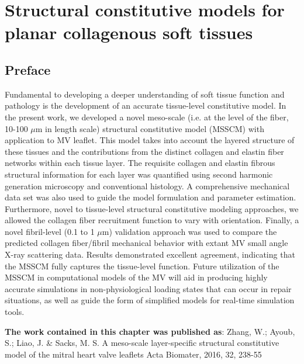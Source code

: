 \chapter{Structural constitutive models for planar collagenous soft tissues}


\section*{Preface}
%

    Fundamental to developing a deeper understanding of soft tissue function and pathology is the development of an accurate tissue-level constitutive model. In the present work, we developed a novel meso-scale (i.e. at the level of the fiber, 10-100 $\mu$m in length scale) structural constitutive model (MSSCM) with application to MV leaflet. This model takes into account the layered structure of these tissues and the contributions from the distinct collagen and elastin fiber networks within each tissue layer. The requisite collagen and elastin fibrous structural information for each layer was quantified using second harmonic generation microscopy and conventional histology. A comprehensive mechanical data set was also used to guide the model formulation and parameter estimation. Furthermore, novel to tissue-level structural constitutive modeling approaches, we allowed the collagen fiber recruitment function to vary with orientation. Finally, a novel fibril-level (0.1 to 1 $\mu$m) validation approach was used to compare the predicted collagen fiber/fibril mechanical behavior with extant MV small angle X-ray scattering data. Results demonstrated excellent agreement, indicating that the MSSCM fully captures the tissue-level function. Future utilization of the MSSCM in computational models of the MV will aid in producing highly accurate simulations in non-physiological loading states that can occur in repair situations, as well as guide the form of simplified models for real-time simulation tools.

\textbf{The work contained in this chapter was published as}:  Zhang, W.; Ayoub, S.; Liao, J. \& Sacks, M. S.
A meso-scale layer-specific structural constitutive model of the mitral heart valve leaflets 
Acta Biomater, 2016, 32, 238-55 
















\newpage







